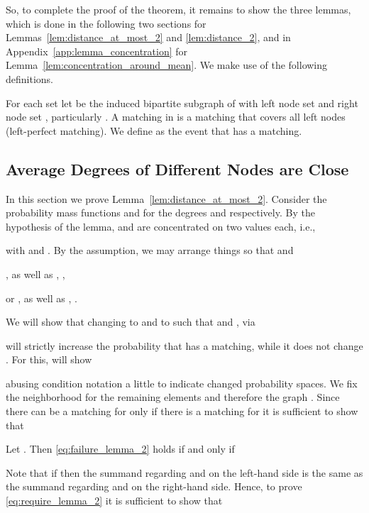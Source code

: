 \let\accentvec\vec \documentclass{llncs}
\begin{document}
So, to complete the proof of the theorem, it remains to show the three lemmas, which
is done in the following two sections for Lemmas~\ref{lem:distance_at_most_2} and \ref{lem:distance_2}, and 
in
\ifnum{}
Appendix~\ref{app:lemma_concentration}
\else
\cite[Appendix A]{full_version}
\fi
for Lemma~\ref{lem:concentration_around_mean}.
We make use of the following definitions.

For each set  let  be the induced bipartite subgraph of  with
left node set  and right node set , particularly .
A matching in  is a matching that covers all left nodes (left-perfect matching).
We define  as the event that  has a matching.
\subsection{Average Degrees of Different Nodes are Close}
\label{sec:lemma_distance_at_most_2}
In this section we prove Lemma~\ref{lem:distance_at_most_2}.
Consider the probability mass functions  and  for the degrees  and  respectively.
By the hypothesis of the lemma,  and  are concentrated on two values each, i.e.,

with  and . By the assumption, we may arrange things so that  and
\begin{compactitem}
\item[] ,  as well as , ,
\item[or ] ,   as well as , .
\end{compactitem}\smallskip
We will show that changing  to 
and  to  such that  and , via

will strictly increase the probability that  has a matching, while it does not change . For this, will show

abusing condition notation a little to indicate changed probability spaces.
We fix the neighborhood  for the remaining elements  and therefore the graph .
Since there can be a matching for  only if there is a matching for  it is sufficient to show that

Let . Then \eqref{eq:failure_lemma_2}
holds if and only if
 
Note that if  then the summand regarding  and  on the left-hand side
is the same as the summand regarding  and  on the right-hand side.
Hence, to prove \eqref{eq:require_lemma_2} it is sufficient to show that
\end{document}
